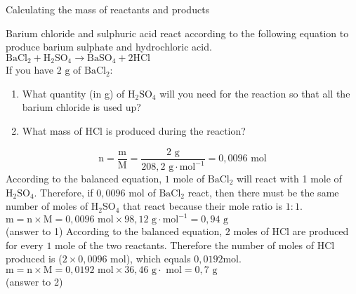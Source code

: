       \begin{wex}{ Calculating the mass of reactants and products }
{
      \label{m38717*id279063}Barium chloride and sulphuric acid react according to the following equation to produce barium sulphate and hydrochloric acid.\\
      \label{m38717*id279070}
        ${\text{BaCl}}_{2}+{\text{H}}_{2}{\text{SO}}_{4}\to {\text{BaSO}}_{4}+2\text{HCl}$
      \\
      \label{m38717*id279141}If you have $2 \text{ g}$ of $\text{BaCl}{}_{2}$:
      \label{m38717*id279158}\begin{enumerate}[noitemsep, label=\textbf{\arabic*}. ] 
\item What quantity (in g) of $\text{H}{}_{2}\text{SO}{}_{4}$ will you need for the reaction so that all the barium chloride is used up?
\item What mass of $\text{HCl}$ is produced during the reaction?
\end{enumerate}     
}
{
        
    \begin{equation*}
    \text{n}=\frac{\text{m}}{\text{M}}=\frac{2 \text{ g}}{208,2 \text{ g} \cdot \text{mol}^{-1}}=0,0096 \text{ mol}
      \end{equation*}
      \label{m38717*id279344}According to the balanced equation, $1$ mole of $\text{BaCl}{}_{2}$ will react with 1 mole of $\text{H}{}_{2}\text{SO}{}_{4}$. Therefore, if $0,0096 \text{ mol}$ of $\text{BaCl}{}_{2}$ react, then there must be the same number of moles of $\text{H}{}_{2}\text{SO}{}_{4}$ that react because their mole ratio is $1:1$.
$ \text{m}=\text{n} \times \text{M} = 0,0096 \text{ mol} \times 98,12 \text{ g} \cdot \text{mol}^{-1} = 0,94 \text{ g}$ \\(answer to 1) 
      \label{m38717*id279513}According to the balanced equation, $2$ moles of $\text{HCl}$ are produced for every $1$ mole of the two reactants. Therefore the number of moles of $\text{HCl}$ produced is ($2 \times 0,0096 \text{ mol}$), which equals $0,0192 \text{mol}$.
   $\text{m}=\text{n} \times \text{M} = 0,0192 \text{ mol} \times 36,46 \text{ g} \cdot \text{ mol} = 0,7 \text{ g}$\\
(answer to 2) 
}
    \end{wex}
    \noindent

